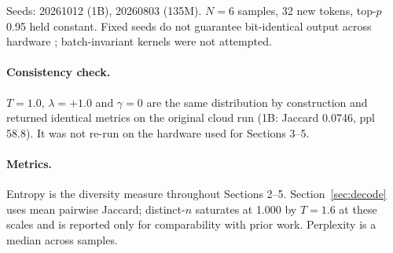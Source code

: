 \documentclass[11pt]{article}
\begin{document}
Seeds: 20261012 (1B), 20260803 (135M). $N = 6$ samples, 32 new tokens, top-$p$ 0.95
held constant. Fixed seeds do not guarantee bit-identical output across hardware
\cite{tml2025}; batch-invariant kernels were not attempted.

\paragraph{Consistency check.} $T = 1.0$, $\lambda = +1.0$ and $\gamma = 0$ are the
same distribution by construction and returned identical metrics on the original
cloud run (1B: Jaccard 0.0746, ppl 58.8). It was not re-run on the hardware used for
Sections 3--5.

\paragraph{Metrics.} Entropy is the diversity measure throughout Sections 2--5.
Section~\ref{sec:decode} uses mean pairwise Jaccard; distinct-$n$ saturates at 1.000
by $T = 1.6$ at these scales and is reported only for comparability with prior work.
Perplexity is a median across samples.
\end{document}
